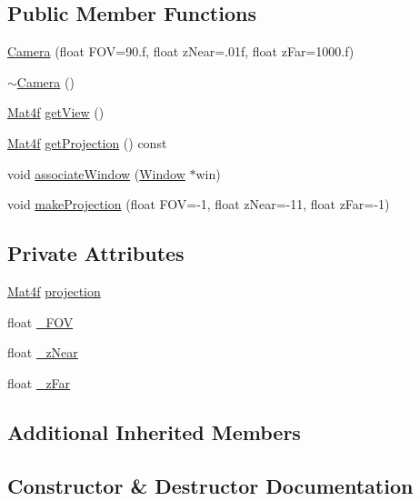 \subsection*{Public Member Functions}
\begin{DoxyCompactItemize}
\item 
\hyperlink{classpcs_1_1Camera_ac45030bc986f4d5f4d029d1750a8bb9a}{Camera} (float F\+OV=90.f, float z\+Near=.\+01f, float z\+Far=1000.\+f)
\item 
\hyperlink{classpcs_1_1Camera_ad46170506d099a71fd7f025a82405310}{$\sim$\+Camera} ()
\item 
\hyperlink{structpcs_1_1Mat4f}{Mat4f} \hyperlink{classpcs_1_1Camera_afb48cb746e7d789dc0395009fd0d03b5}{get\+View} ()
\item 
\hyperlink{structpcs_1_1Mat4f}{Mat4f} \hyperlink{classpcs_1_1Camera_a54785d1551fb6d273f77b6bcf806837b}{get\+Projection} () const
\item 
void \hyperlink{classpcs_1_1Camera_af43d459cebd61a86a492d632e2b4bd14}{associate\+Window} (\hyperlink{classpcs_1_1Window}{Window} $\ast$win)
\item 
void \hyperlink{classpcs_1_1Camera_a7595a6bbed4b3608cb264ff1a16b6516}{make\+Projection} (float F\+OV=-\/1, float z\+Near=-\/11, float z\+Far=-\/1)
\end{DoxyCompactItemize}
\subsection*{Private Attributes}
\begin{DoxyCompactItemize}
\item 
\hyperlink{structpcs_1_1Mat4f}{Mat4f} \hyperlink{classpcs_1_1Camera_ae70659a115f743ad3da47e10a52c24b3}{projection}
\item 
float \hyperlink{classpcs_1_1Camera_a604debcdfaf49edd5a9d513e7c0ed880}{\+\_\+\+F\+OV}
\item 
float \hyperlink{classpcs_1_1Camera_a5ecff3330616665cb449d3e687373d7d}{\+\_\+z\+Near}
\item 
float \hyperlink{classpcs_1_1Camera_a4f072907820f923c48a5e875c9b05f7b}{\+\_\+z\+Far}
\end{DoxyCompactItemize}
\subsection*{Additional Inherited Members}


\subsection{Constructor \& Destructor Documentation}
\mbox{\label{classpcs_1_1Camera_ac45030bc986f4d5f4d029d1750a8bb9a}} 
